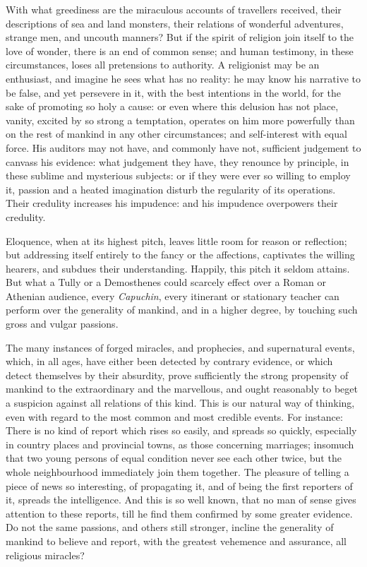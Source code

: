 \documentclass[]{article}
\begin{document}
\begin{sectionbody}
\humeparagraph  With what greediness are the miraculous accounts of travellers received, their descriptions of sea and land monsters, their relations of wonderful adventures, strange men, and uncouth manners? But if the spirit of religion join itself to the love of wonder, there is an end of common sense; and human testimony, in these circumstances, loses all pretensions to authority. A religionist may be an enthusiast, and imagine he sees what has no reality: he may know his narrative to be false, and yet persevere in it, with the best intentions in the world, for the sake of promoting so holy a cause: or even where this delusion has not place, vanity, excited by so strong a temptation, operates on him more powerfully than on the rest of mankind in any other circumstances; and self-interest with equal force. His auditors may not have, and commonly have not, sufficient judgement to canvass his evidence: what judgement they have, they renounce by principle, in these sublime and mysterious subjects: or if they were ever so willing to employ it, passion and a heated imagination disturb the regularity of its operations. Their credulity increases his impudence: and his impudence overpowers their credulity.

\humeparagraph  Eloquence, when at its highest pitch, leaves little room for reason or reflection; but addressing itself entirely to the fancy or the affections, captivates the willing hearers, and subdues their understanding. Happily, this pitch it seldom attains. But what a Tully or a Demosthenes could scarcely effect over a Roman or Athenian audience, every \emph{Capuchin}, every itinerant or stationary teacher can perform over the generality of mankind, and in a higher degree, by touching such gross and vulgar passions.

\humeparagraph  The many instances of forged miracles, and prophecies, and supernatural events, which, in all ages, have either been detected by contrary evidence, or which detect themselves by their absurdity, prove sufficiently the strong propensity of mankind to the extraordinary and the marvellous, and ought reasonably to beget a suspicion against all relations of this kind. This is our natural way of thinking, even with regard to the most common and most credible events. For instance: There is no kind of report which rises so easily, and spreads so quickly, especially in country places and provincial towns, as those concerning marriages; insomuch that two young persons of equal condition never see each other twice, but the whole neighbourhood immediately join them together. The pleasure of telling a piece of news so interesting, of propagating it, and of being the first reporters of it, spreads the intelligence. And this is so well known, that no man of sense gives attention to these reports, till he find them confirmed by some greater evidence. Do not the same passions, and others still stronger, incline the generality of mankind to believe and report, with the greatest vehemence and assurance, all religious miracles?


\end{sectionbody}
\end{document}
